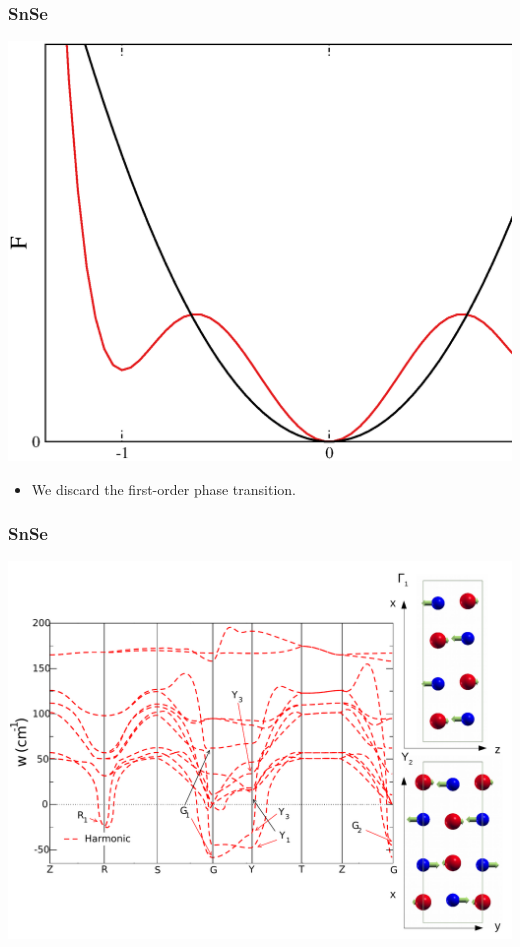\documentclass{beamer}
\begin{document}

\begin{frame}

 \frametitle{SnSe}
 \vspace{-0.5cm}
 \begin{center}
  \includegraphics[width=0.75\linewidth]{Pictures/SnSe/data-case.eps}
 \end{center}
 \begin{itemize}
  \item We discard the first-order phase transition.
 \end{itemize}

\end{frame}


\begin{frame}

\frametitle{SnSe}
\begin{center}
 \includegraphics[width=0.85\linewidth]{Pictures/SnSe/figure4.pdf}
\end{center}

\end{frame}
\end{document}
